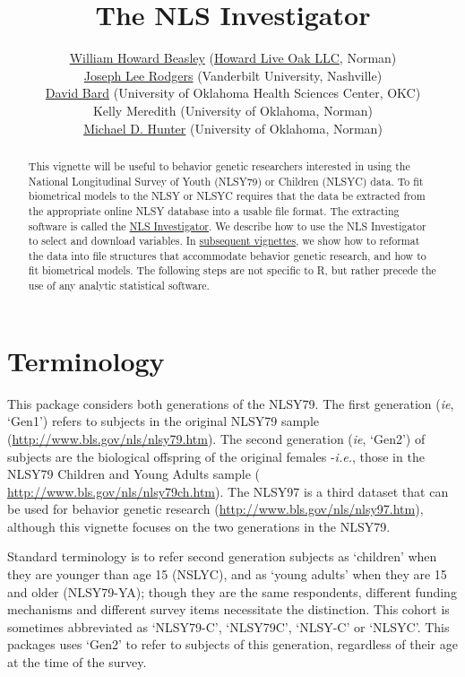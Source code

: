 \documentclass{article}\usepackage[]{graphicx}\usepackage[]{color}
\title{The NLS Investigator}
\author{
  \href{http://scholar.google.com/citations?user=ffsJTC0AAAAJ}{William Howard Beasley} (\href{http://howardliveoak.com/}{Howard Live Oak LLC}, Norman)\\
  \href{http://www.vanderbilt.edu/psychological_sciences/bio/joe-rodgers}{Joseph Lee Rodgers} (Vanderbilt University, Nashville)\\
  \href{http://find.ouhsc.edu/Faculty.aspx?FacultyID=1041}{David Bard} (University of Oklahoma Health Sciences Center, OKC)\\
  Kelly Meredith (University of Oklahoma, Norman)\\
  \href{http://students.ou.edu/H/Michael.D.Hunter-1/}{Michael D. Hunter} (University of Oklahoma, Norman)
}
\begin{document}
\newcommand{\code}[1]{\texttt{\small{#1}}}
\newcommand{\pkg}[1]{\textsf{\small{#1}}}
\let\proglang=\textsf
\newcommand{\R}{\proglang{R}} %

\maketitle
\tableofcontents

\begin{abstract}
This vignette will be useful to behavior genetic researchers interested in using the National Longitudinal Survey of Youth (NLSY79) or Children (NLSYC) data.  To fit biometrical models to the NLSY or NLSYC requires that the data be extracted from the appropriate online NLSY database into a usable file format.  The extracting software is called the \href{https://www.nlsinfo.org/investigator/pages/login.jsp}{NLS Investigator}.  We describe how to use the NLS Investigator to select and download variables.   In \href{http://cran.r-project.org/web/packages/NlsyLinks/}{subsequent vignettes}, we show how to reformat the data into file structures that accommodate behavior genetic research, and how to fit biometrical models.  The following steps are not specific to \R{}, but rather precede the use of any analytic statistical software.
\end{abstract}



\section{Terminology} %
This package considers both generations of the NLSY79.  The first generation (\emph{ie}, `Gen1') refers to subjects in the original NLSY79 sample (\url{http://www.bls.gov/nls/nlsy79.htm}).  The second generation (\emph{ie}, `Gen2') of subjects are the biological offspring of the original females -\emph{i.e.}, those in the NLSY79 Children and Young Adults sample ( \url{http://www.bls.gov/nls/nlsy79ch.htm}).  The NLSY97 is a third dataset that can be used for behavior genetic research (\url{http://www.bls.gov/nls/nlsy97.htm}), although this vignette focuses on the two generations in the NLSY79.

Standard terminology is to refer second generation subjects as `children' when they are younger than age 15 (NSLYC), and as `young adults' when they are 15 and older (NLSY79-YA); though they are the same respondents, different funding mechanisms and different survey items necessitate the distinction.  This cohort is sometimes abbreviated as `NLSY79-C', `NLSY79C', `NLSY-C' or `NLSYC'. This packages uses `Gen2' to refer to subjects of this generation, regardless of their age at the time of the survey.
\end{document}
